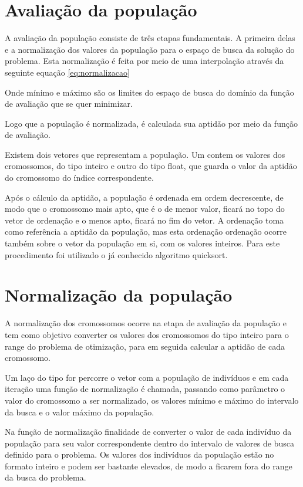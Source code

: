 \documentclass[
    12pt,               %
    twoside,            %
    a4paper,            %
    english,            %
    french,             %
    spanish,            %
    brazil,             %
    ]{abntex2}
\begin{document}
\section{Avaliação da população}

  A avaliação da população consiste de três etapas fundamentais. A primeira delas e a normalização dos valores da população para o espaço de busca da solução do problema. Esta normalização é  feita por meio de uma interpolação através da seguinte equação \ref{eq:normalizacao}

  

  Onde mínimo e máximo são os limites do espaço de busca do domínio da função de avaliação que se quer minimizar. 

  Logo que a população é normalizada, é calculada sua aptidão por meio da função de avaliação.

  Existem dois vetores que representam a população. Um contem os valores dos cromossomos, do tipo inteiro e outro do tipo float, que guarda o valor da aptidão do cromossomo do índice correspondente. 

  Após o cálculo da aptidão, a população é ordenada em ordem decrescente, de modo que o cromossomo mais apto, que é o de menor valor, ficará no topo do vetor de ordenação e o menos apto, ficará no fim do vetor. A ordenação toma como referência a aptidão da população, mas esta ordenação ordenação ocorre também sobre o vetor da população em si, com os valores inteiros. Para este procedimento foi utilizado o já conhecido algoritmo quicksort.

\section{Normalização da população}

  A normalização dos cromossomos ocorre na etapa de avaliação da população e tem como objetivo converter os valores dos cromossomos do tipo inteiro para o range do problema de otimização, para em seguida calcular a aptidão de cada cromossomo.

  Um laço do tipo for percorre o vetor com a população de indivíduos e em cada iteração uma função  de normalização é chamada, passando como parâmetro o valor do cromossomo a ser normalizado, os valores mínimo e máximo do intervalo da busca e o valor máximo da população.
  
  Na função de normalização finalidade de converter o valor de cada indivíduo da população para seu valor correspondente dentro do intervalo de valores de busca definido para o problema.  Os valores dos indivíduos da população estão no formato inteiro e podem ser bastante elevados, de modo a ficarem fora do range da busca do problema.
\end{document}
